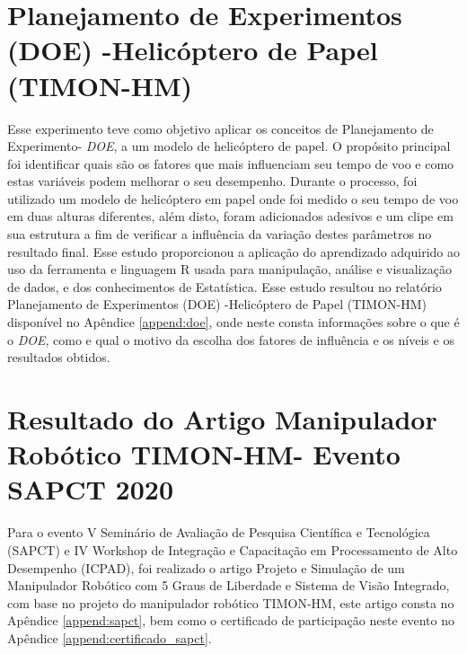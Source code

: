 \section{Planejamento de Experimentos (DOE) -Helicóptero de Papel (TIMON-HM)}
\label{sec:analise_doe}
Esse experimento teve como objetivo aplicar os conceitos de Planejamento de Experimento- \textit{DOE}, a um modelo de helicóptero de papel. O propósito principal foi identificar quais são os fatores que mais influenciam seu tempo de voo e como estas variáveis podem melhorar o seu desempenho. Durante o processo, foi utilizado um modelo de helicóptero em papel onde foi medido o seu tempo de voo em duas alturas diferentes, além disto, foram adicionados adesivos e um clipe em sua estrutura a fim de verificar a influência da variação destes parâmetros no resultado final. Esse estudo proporcionou a aplicação do aprendizado adquirido ao uso da ferramenta e linguagem R usada para manipulação, análise e visualização de dados, e dos conhecimentos de Estatística. 
Esse estudo resultou no relatório Planejamento de Experimentos (DOE) -Helicóptero de Papel (TIMON-HM) disponível no Apêndice \ref{append:doe}, onde neste consta informações sobre o que é o \textit{DOE}, como e qual o motivo da escolha dos fatores de influência e os níveis e os resultados obtidos. 

\section{Resultado do Artigo Manipulador Robótico TIMON-HM- Evento SAPCT 2020 }
\label{sec:sapct}
Para o evento V Seminário de Avaliação de Pesquisa Científica e Tecnológica (SAPCT) e IV Workshop de Integração e Capacitação em Processamento de Alto Desempenho (ICPAD), foi realizado o artigo Projeto e Simulação de um Manipulador Robótico com 5 Graus de Liberdade e Sistema de Visão Integrado, com base no projeto do manipulador robótico TIMON-HM, este artigo consta no Apêndice \ref{append:sapct}, bem como o certificado de participação neste evento no Apêndice \ref{append:certificado_sapct}.


